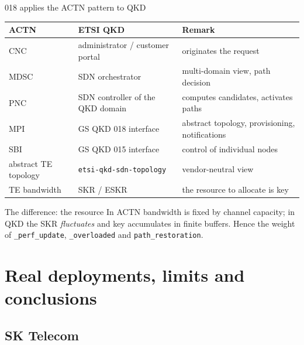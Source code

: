 \documentclass[10pt]{beamer}
\begin{document}
\begin{frame}{018 applies the ACTN pattern to QKD}
  \footnotesize
  \begin{tabularx}{\textwidth}{@{}l l L@{}}
    \toprule
    \textbf{ACTN} & \textbf{ETSI QKD} & \textbf{Remark} \\
    \midrule
    CNC & administrator / customer portal & originates the request \\
    MDSC & SDN orchestrator & multi-domain view, path decision \\
    PNC & SDN controller of the QKD domain & computes candidates, activates paths \\
    MPI & GS QKD 018 interface & abstract topology, provisioning, notifications \\
    SBI & GS QKD 015 interface & control of individual nodes \\
    abstract TE topology & \texttt{etsi-qkd-sdn-topology} & vendor-neutral view \\
    TE bandwidth & SKR / ESKR & the resource to allocate is key \\
    \bottomrule
  \end{tabularx}
  \vspace{1ex}
  \begin{alertblock}{The difference: the resource}
    In ACTN bandwidth is fixed by channel capacity; in QKD the SKR
    \emph{fluctuates} and key accumulates in finite buffers. Hence the weight
    of \texttt{\_perf\_update}, \texttt{\_overloaded} and
    \texttt{path\_restoration}.
  \end{alertblock}
\end{frame}

\section[Deployments and conclusions]{Real deployments, limits and conclusions}

\subsection{SK Telecom}
\end{document}
